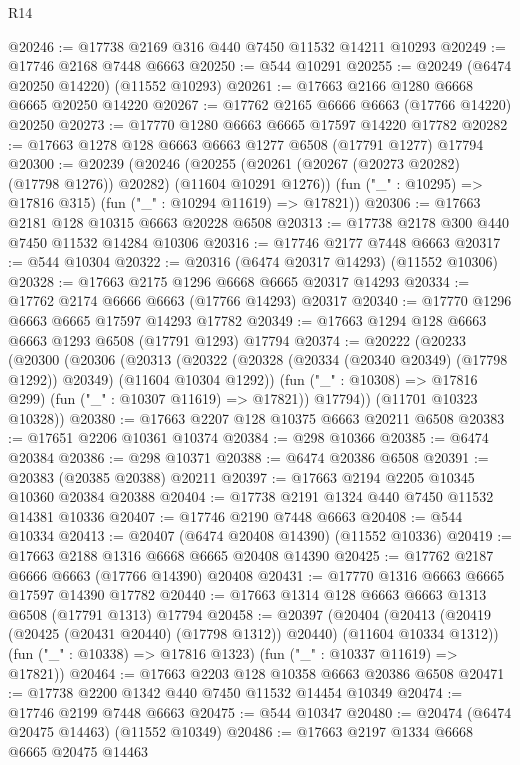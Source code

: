 \begin{lexlean}{R14}
\begin{coremodule}
@20246 := @17738 @2169 @316 @440 @7450 @11532 @14211 @10293
@20249 := @17746 @2168 @7448 @6663
@20250 := @544 @10291
@20255 := @20249 (@6474 @20250 @14220) (@11552 @10293)
@20261 := @17663 @2166 @1280 @6668 @6665 @20250 @14220
@20267 := @17762 @2165 @6666 @6663 (@17766 @14220) @20250
@20273 := @17770 @1280 @6663 @6665 @17597 @14220 @17782
@20282 := @17663 @1278 @128 @6663 @6663 @1277 @6508 (@17791 @1277) @17794
@20300 := @20239
    (@20246
      (@20255 (@20261 (@20267 (@20273 @20282) (@17798 @1276)) @20282) (@11604 @10291 @1276))
      (fun ("_" : @10295) => @17816 @315)
      (fun ("_" : @10294 @11619) => @17821))
@20306 := @17663 @2181 @128 @10315 @6663 @20228 @6508
@20313 := @17738 @2178 @300 @440 @7450 @11532 @14284 @10306
@20316 := @17746 @2177 @7448 @6663
@20317 := @544 @10304
@20322 := @20316 (@6474 @20317 @14293) (@11552 @10306)
@20328 := @17663 @2175 @1296 @6668 @6665 @20317 @14293
@20334 := @17762 @2174 @6666 @6663 (@17766 @14293) @20317
@20340 := @17770 @1296 @6663 @6665 @17597 @14293 @17782
@20349 := @17663 @1294 @128 @6663 @6663 @1293 @6508 (@17791 @1293) @17794
@20374 := @20222
    (@20233
      (@20300
        (@20306
          (@20313
            (@20322 (@20328 (@20334 (@20340 @20349) (@17798 @1292)) @20349) (@11604 @10304 @1292))
            (fun ("_" : @10308) => @17816 @299)
            (fun ("_" : @10307 @11619) => @17821))
          @17794))
      (@11701 @10323 @10328))
@20380 := @17663 @2207 @128 @10375 @6663 @20211 @6508
@20383 := @17651 @2206 @10361 @10374
@20384 := @298 @10366
@20385 := @6474 @20384
@20386 := @298 @10371
@20388 := @6474 @20386 @6508
@20391 := @20383 (@20385 @20388) @20211
@20397 := @17663 @2194 @2205 @10345 @10360 @20384 @20388
@20404 := @17738 @2191 @1324 @440 @7450 @11532 @14381 @10336
@20407 := @17746 @2190 @7448 @6663
@20408 := @544 @10334
@20413 := @20407 (@6474 @20408 @14390) (@11552 @10336)
@20419 := @17663 @2188 @1316 @6668 @6665 @20408 @14390
@20425 := @17762 @2187 @6666 @6663 (@17766 @14390) @20408
@20431 := @17770 @1316 @6663 @6665 @17597 @14390 @17782
@20440 := @17663 @1314 @128 @6663 @6663 @1313 @6508 (@17791 @1313) @17794
@20458 := @20397
    (@20404
      (@20413 (@20419 (@20425 (@20431 @20440) (@17798 @1312)) @20440) (@11604 @10334 @1312))
      (fun ("_" : @10338) => @17816 @1323)
      (fun ("_" : @10337 @11619) => @17821))
@20464 := @17663 @2203 @128 @10358 @6663 @20386 @6508
@20471 := @17738 @2200 @1342 @440 @7450 @11532 @14454 @10349
@20474 := @17746 @2199 @7448 @6663
@20475 := @544 @10347
@20480 := @20474 (@6474 @20475 @14463) (@11552 @10349)
@20486 := @17663 @2197 @1334 @6668 @6665 @20475 @14463

\end{coremodule}
\end{lexlean}

